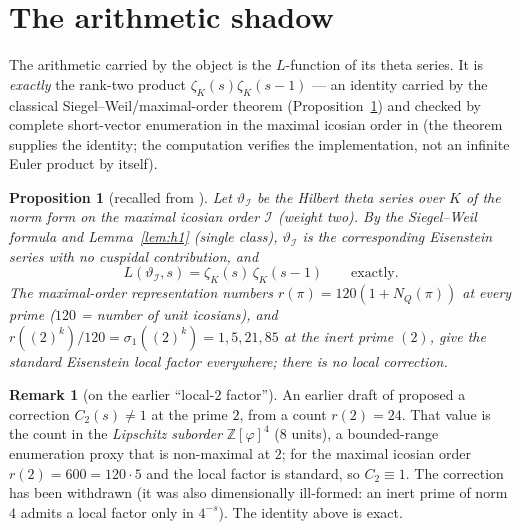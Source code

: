 \documentclass[11pt]{article}
\newtheorem{proposition}[theorem]{Proposition}
\theoremstyle{definition}
\newtheorem{remark}[theorem]{Remark}
\newcommand{\Z}{\mathbb{Z}}
\newcommand{\zetaK}{\zeta_{K}}
\newcommand{\Icos}{\mathcal{I}}
\renewcommand{\Theta}{\vartheta}
\begin{document}
\section{The arithmetic shadow}\label{sec:shadow}
The arithmetic carried by the object is the $L$-function of its theta series. It is
\emph{exactly} the rank-two product $\zetaK(s)\zetaK(s-1)$ --- an identity carried by the
classical Siegel--Weil/maximal-order theorem (Proposition~\ref{prop:icosian}) and checked
by complete short-vector enumeration in the maximal icosian order in \cite{IcosianTriad}
(the theorem supplies the identity; the computation verifies the implementation, not an
infinite Euler product by itself).

\begin{proposition}[recalled from \cite{IcosianTriad}]\label{prop:icosian}
Let $\Theta_{\Icos}$ be the Hilbert theta series over $K$ of the norm form on the
maximal icosian order $\Icos$ (weight two). By the Siegel--Weil formula
\cite{Siegel,Weil1965} and Lemma~\ref{lem:h1} (single class), $\Theta_{\Icos}$ is the
corresponding Eisenstein series with no cuspidal contribution, and
\[
   L(\Theta_{\Icos},s)=\zetaK(s)\,\zetaK(s-1)\qquad\text{exactly.}
\]
The maximal-order representation numbers $r(\pi)=120(1+N_Q(\pi))$ at every prime
($120$ = number of unit icosians), and $r((2)^k)/120=\sigma_1((2)^k)=1,5,21,85$ at the
inert prime $(2)$, give the standard Eisenstein local factor everywhere; there is no
local correction.
\end{proposition}
\begin{remark}[on the earlier ``local-$2$ factor'']\label{rem:c2}
An earlier draft of \cite{IcosianTriad} proposed a correction $C_2(s)\ne1$ at the prime
$2$, from a count $r(2)=24$. That value is the count in the \emph{Lipschitz suborder}
$\Z[\varphi]^4$ ($8$ units), a bounded-range enumeration proxy that is non-maximal at
$2$; for the maximal icosian order $r(2)=600=120\cdot5$ and the local factor is
standard, so $C_2\equiv 1$. The correction has been withdrawn (it was also
dimensionally ill-formed: an inert prime of norm $4$ admits a local factor only in
$4^{-s}$). The identity above is exact.
\end{remark}
\end{document}
